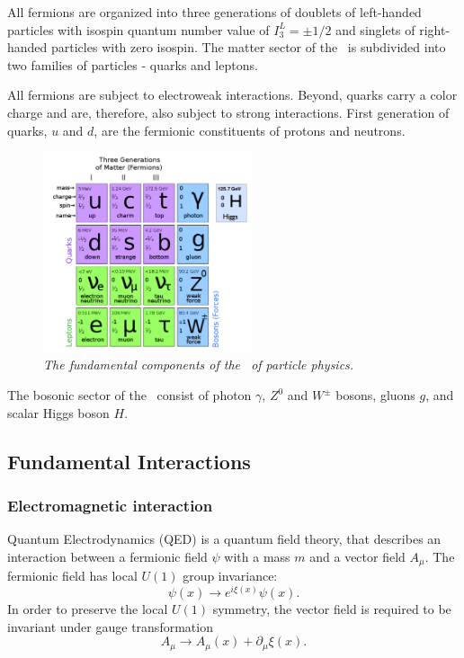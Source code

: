 All fermions are organized into three generations of  doublets of left-handed particles with isospin quantum number value of $I^L_3 = \pm1/2$ and singlets of right-handed particles with zero isospin.
The matter sector of the \sm\ is subdivided into two families of particles - quarks and leptons.

All fermions are subject to electroweak interactions. Beyond, quarks carry a color charge and are, therefore, also subject to strong interactions.
First generation of quarks, $u$ and $d$, are the fermionic constituents of protons and neutrons. 

\begin{figure}[h]
{\centering
    \includegraphics[width=0.55\textwidth]{graphics/Plots_Standard_Model.png}
    \caption{\sl The fundamental components of the \sm\ of particle physics.}
    \label{fig:ComponentsSM}
  }
\end{figure}

The bosonic sector of the \sm\ consist of photon $\gamma$, $Z^0$ and $W^\pm$ bosons, gluons $g$, and scalar Higgs boson $H$.
 


\subsection{Fundamental Interactions}
\subsubsection{Electromagnetic interaction}
\label{sec:QED_SM}
Quantum Electrodynamics (QED) is a quantum field theory, that describes an interaction between a fermionic field $\psi$ with a mass $m$ and a vector field $A_\mu$. 
The fermionic field has local $U(1)$ group invariance: %
\begin{equation}
	\psi(x) \to e^{i\xi (x)}\psi(x).
\end{equation}
In order to preserve the local $U(1)$ symmetry, the vector field is required to be invariant under gauge transformation
\begin{equation}
A_\mu \to A_\mu (x) + \partial_\mu \xi(x).
\end{equation} 

